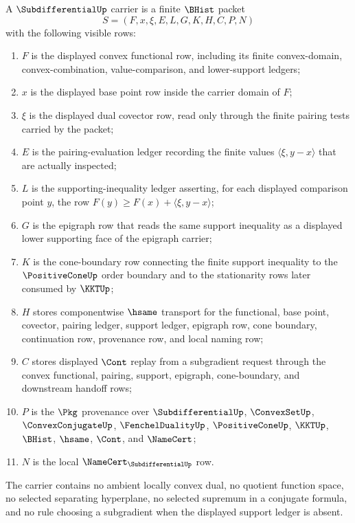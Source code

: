 \begin{definition}
\label{def:subdifferential-carrier}
A $\SubdifferentialUp$ carrier is a finite $\BHist$ packet
$$
S=(F,x,\xi,E,L,G,K,H,C,P,N)
$$
with the following visible rows:
\begin{enumerate}
\item $F$ is the displayed convex functional row, including its finite convex-domain, convex-combination, value-comparison, and lower-support ledgers;
\item $x$ is the displayed base point row inside the carrier domain of $F$;
\item $\xi$ is the displayed dual covector row, read only through the finite pairing tests carried by the packet;
\item $E$ is the pairing-evaluation ledger recording the finite values $\langle \xi,y-x\rangle$ that are actually inspected;
\item $L$ is the supporting-inequality ledger asserting, for each displayed comparison point $y$, the row $F(y)\geq F(x)+\langle \xi,y-x\rangle$;
\item $G$ is the epigraph row that reads the same support inequality as a displayed lower supporting face of the epigraph carrier;
\item $K$ is the cone-boundary row connecting the finite support inequality to the $\PositiveConeUp$ order boundary and to the stationarity rows later consumed by $\KKTUp$;
\item $H$ stores componentwise $\hsame$ transport for the functional, base point, covector, pairing ledger, support ledger, epigraph row, cone boundary, continuation row, provenance row, and local naming row;
\item $C$ stores displayed $\Cont$ replay from a subgradient request through the convex functional, pairing, support, epigraph, cone-boundary, and downstream handoff rows;
\item $P$ is the $\Pkg$ provenance over $\SubdifferentialUp$, $\ConvexSetUp$, $\ConvexConjugateUp$, $\FenchelDualityUp$, $\PositiveConeUp$, $\KKTUp$, $\BHist$, $\hsame$, $\Cont$, and $\NameCert$;
\item $N$ is the local $\NameCert_{\SubdifferentialUp}$ row.
\end{enumerate}
The carrier contains no ambient locally convex dual, no quotient function space, no selected separating hyperplane, no selected supremum in a conjugate formula, and no rule choosing a subgradient when the displayed support ledger is absent.
\end{definition}

